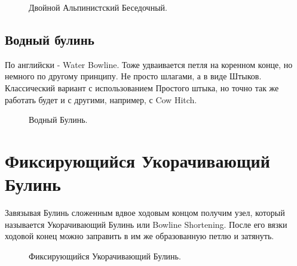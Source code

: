 \documentclass{artikel1}
\begin{document}
\begin{figure}[H]\centering
	\begin{minipage}{1\linewidth}
		\begin{center}
			\tcbox[enhanced jigsaw,colframe=black,opacityframe=0.5,opacityback=0.5]
			{\centering{}}
		\end{center}
	\end{minipage}
\caption{Двойной Альпинистский Беседочный.}
\label{ris:Besedochny-Mountaineering-Double}
\end{figure}

\subsection{Водный булинь}

По английски - Water Bowline. Тоже удваивается петля на коренном конце, но немного по другому принципу. Не просто шлагами, а в виде Штыков. Классический вариант с использованием Простого штыка, но точно так же работать будет и с другими, например, с Cow Hitch.

\begin{figure}[H]\centering
\hfill
	\caption{Водный Булинь.}\label{ris:Besedochny-Water}
\end{figure}

\section{Фиксирующийся Укорачивающий Булинь}

Завязывая Булинь сложенным вдвое ходовым концом получим узел, который называется Укорачивающий Булинь или Bowline Shortening. После его вязки ходовой конец можно заправить в им же образованную петлю и затянуть.

\begin{figure}[H]\centering
\hfill
	\caption{Фиксирующийся Укорачивающий Булинь.}\label{ris:Double_Bowline_Brimingham}
\end{figure}
\end{document}
